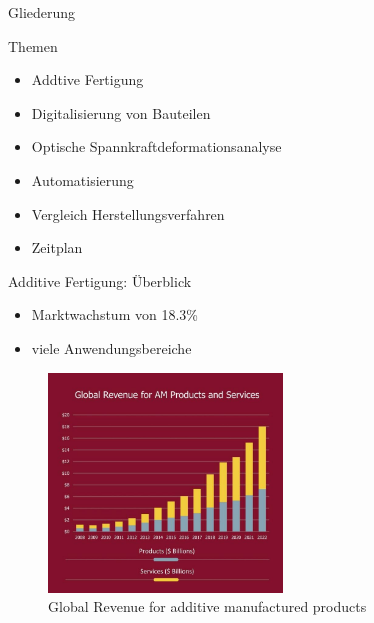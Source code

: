 \documentclass[../slides.tex]{subfiles}
\begin{document}
\begin{frame}{Gliederung}
    \begin{block}{Themen}
        \begin{itemize}
            \item Addtive Fertigung
            \item Digitalisierung von Bauteilen
            \item Optische Spannkraftdeformationsanalyse
            \item Automatisierung
            \item Vergleich Herstellungsverfahren
            \item Zeitplan
        \end{itemize}
      \end{block}
\end{frame}

\begin{frame}{Additive Fertigung: Überblick}
  \begin{minipage}[t]{.40\textwidth}
    \begin{itemize}[]
      \item Marktwachstum von 18.3\%
      \item viele Anwendungsbereiche
    \end{itemize}  
  \end{minipage}
  \hfill
  \begin{minipage}[t]{.59\textwidth}
    \begin{figure}[]
      \includegraphics[height=165pt]{img_niklas/Picture3-1-scaled_0FB63A00-D319-40EF-A648-9739A68215D6.jpg}
      \caption[short]{Global Revenue for additive manufactured products}
    \end{figure}
  \end{minipage}
\end{frame}
\end{document}
